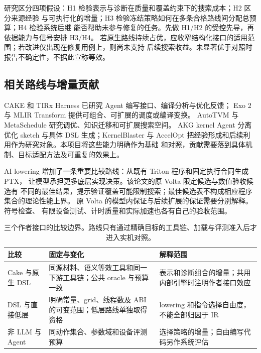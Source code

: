 \documentclass[UTF8,11pt,a4paper,fontset=none]{ctexart}
\begin{document}
研究区分四项假设：H1 检验表示与诊断在质量和覆盖约束下的搜索成本；H2 区分来源经验
与可执行化的增量；H3 检验冻结策略如何在多条合格路线间分配总预算；H4 检验系统后继
能否帮助未参与修复的任务。先做 H1/H2 的受控先导，再依据能力与信号安排 H3/H4。
若原生路线持续占优，应收窄结构化接口的适用范围；若改进仅出现在修复用例上，则尚未支持
后续搜索收益。未显著优于对照时报告不确定性，不据此宣称等效。

\subsection{相关路线与增量贡献}
CAKE 和 TIRx Harness 已研究 Agent 编写接口、编译分析与优化反馈\cite{cake,tirxharness}；
Exo 2 与 MLIR Transform 提供可组合、可扩展的调度或编译变换\cite{exo2,mlirtransform}。
AutoTVM 与 MetaSchedule 研究调优、知识迁移和可扩展搜索空间\cite{autotvm,metaschedule}。
AKG kernel Agent 分离优化 sketch 与具体 DSL 生成\cite{akgagent}；KernelBlaster 与 AccelOpt
把经验形成和后续利用作为研究对象\cite{kernelblaster,accelopt}。本项目将这些能力明确作为基础
和对照，贡献需要落到具体机制、目标适配方法及可重复的效果上。

AI lowering 增加了一条重要比较路线：从既有 Triton 程序和固定执行合同生成 PTX，
让模型承担更多底层实现决策\cite{ailowering}。该论文的原 Volta 限定候选与数值验收候选有
不同的最佳结果，提示验证覆盖可能限制搜索；最佳候选表不构成相应程序集合的理论性能上界。
原 Volta 的模型内保证与后续扩展的保证需要分别解释\cite{volta,ailowering}。符号检查、
有限设备测试、计时质量和实际加速也各有自己的验收范围。

\begin{table}[htbp]
\centering\small
\caption{三个作者接口的比较边界。路线只有通过精确目标的工具链、加载与评测准入后才进入实机对照。}
\begin{tabularx}{\textwidth}{@{}p{28mm}Y Y@{}}
\toprule
{}比较 & 固定与变化 & 解释范围 \\
\midrule
Cake 与原生 DSL & 同源材料、语义等效工具和同一下游工具链；公共 oracle 与预算一致 & 表示和诊断组合的增量；共用内部引擎时注明作者接口效应 \\
DSL 与直接低层 & 明确常量、grid、线程数及 ABI 的可变范围；低层路线单独取得资格 & lowering 和指令选择自由度，不能全部归因于 IR \\
非 LLM 与 Agent & 同动作集合、参数域和设备评测预算 & 选择策略的增量；自由编写代码另作系统评估 \\
\bottomrule
\end{tabularx}
\end{table}
\end{document}
